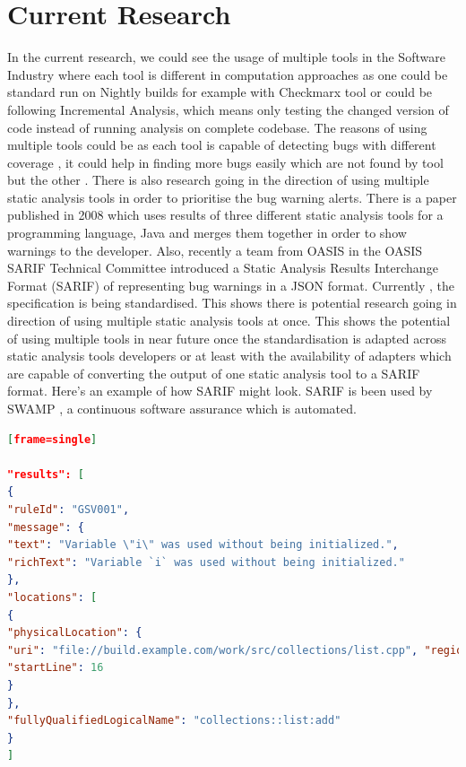 \section{Current Research}

In the current research, we could see the usage of multiple tools in the Software Industry where each tool is different in computation approaches as one could be standard run on Nightly builds for example with Checkmarx \cite{checkmarx} tool or could be following Incremental Analysis, which means only testing the changed version of code instead of running analysis on complete codebase. The reasons of using multiple tools could be as each tool is capable of detecting bugs with different coverage \cite{bessey2010few} \cite{delaitre2015evaluating}, it could help in finding more bugs easily which are not found by tool but the other \cite{plakosh2014improving}. There is also research \cite{flynn2018prioritizing} going in the direction of using multiple static analysis tools in order to prioritise the bug warning alerts. There is a paper \cite{meng2008approach} published in 2008 which uses results of three different static analysis tools for a programming language, Java and merges them together in order to show warnings to the developer. Also, recently a team from OASIS \cite{oasis} in the OASIS SARIF Technical Committee \cite{oasis-tc} introduced a Static Analysis Results Interchange Format (SARIF) of representing bug warnings in a JSON format. Currently \cite{sarif-git}, the specification is being standardised. This shows there is potential research going in direction of using multiple static analysis tools at once. This shows the potential of using multiple tools in near future once the standardisation is adapted across static analysis tools developers or at least with the availability of adapters which are capable of converting the output of one static analysis tool to a SARIF format. Here's an example \cite{sarif-example} of how SARIF might look. SARIF is been used by SWAMP \cite{swamp-scarf-sarif}, a continuous software assurance which is automated.

\begin{lstlisting}[language=json,firstnumber=1][frame=single]

"results": [
{
"ruleId": "GSV001",
"message": {
"text": "Variable \"i\" was used without being initialized.",
"richText": "Variable `i` was used without being initialized." 
},
"locations": [
{
"physicalLocation": {
"uri": "file://build.example.com/work/src/collections/list.cpp", "region": {
"startLine": 16
}
},
"fullyQualifiedLogicalName": "collections::list:add"
}
]


\end{lstlisting}


